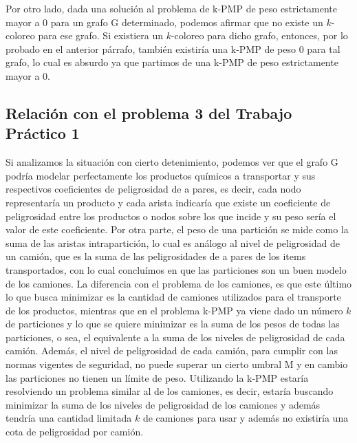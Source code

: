 Por otro lado, dada una solución al problema de k-PMP de peso estrictamente mayor a $0$ para un grafo G determinado, podemos afirmar que no existe un $k$-coloreo para ese grafo. Si existiera un $k$-coloreo para dicho grafo, entonces, por lo probado en el anterior párrafo, también existiría una k-PMP de peso $0$ para tal grafo, lo cual es absurdo ya que partimos de una k-PMP de peso estrictamente mayor a $0$.

\subsection{Relación con el problema 3 del Trabajo Práctico 1}

Si analizamos la situación con cierto detenimiento, podemos ver que el grafo G podría modelar perfectamente los productos químicos a transportar y sus respectivos coeficientes de peligrosidad de a pares, es decir, cada nodo representaría un producto y cada arista indicaría que existe un coeficiente de peligrosidad entre los productos o nodos sobre los que incide y su peso sería el valor de este coeficiente. Por otra parte, el peso de una partición se mide como la suma de las aristas intrapartición, lo cual es análogo al nivel de peligrosidad de un camión, que es la suma de las peligrosidades de a pares de los items transportados, con lo cual concluímos en que las particiones son un buen modelo de los camiones. La diferencia con el problema de los camiones, es que este último lo que busca minimizar es la cantidad de camiones utilizados para el transporte de los productos, mientras que en el problema k-PMP ya viene dado un número $k$ de particiones y lo que se quiere minimizar es la suma de los pesos de todas las particiones, o sea, el equivalente a la suma de los niveles de peligrosidad de cada camión. Además, el nivel de peligrosidad de cada camión, para cumplir con las normas vigentes de seguridad, no puede superar un cierto umbral M y en cambio las particiones no tienen un límite de peso. Utilizando la k-PMP estaría resolviendo un problema similar al de los camiones, es decir, estaría buscando minimizar la suma de los niveles de peligrosidad de los camiones y además tendría una cantidad limitada $k$ de camiones para usar y además no existiría una cota de peligrosidad por camión.